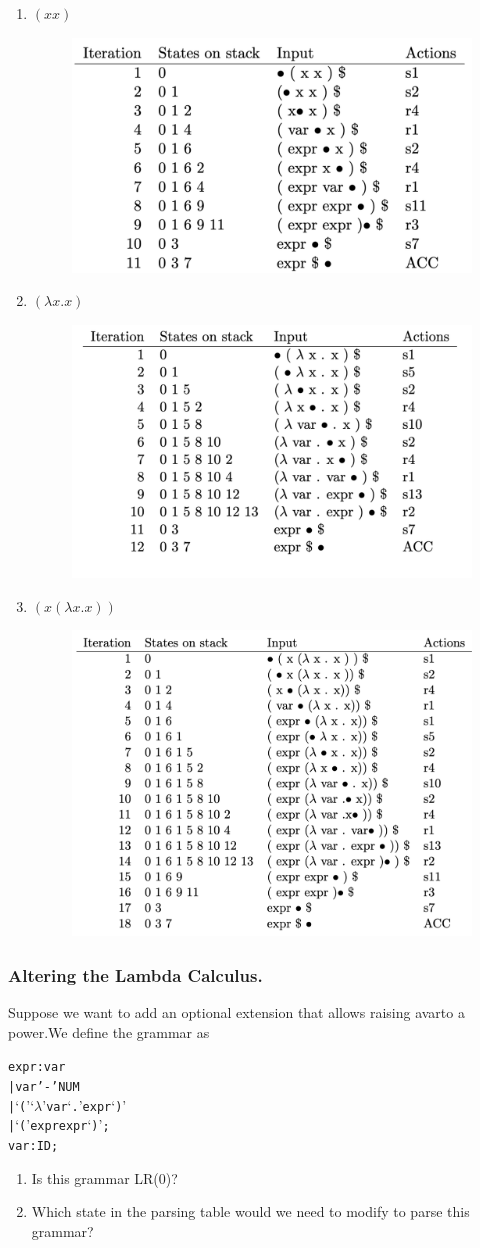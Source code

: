 \documentclass[a4paper]{exam}
\begin{document}
\begin{enumerate}
    \item $(x x)$
     \begin{figure}[htbp]
    \centering
    \includegraphics[width=0.5\columnwidth]{./img/lambda0.png}
  \end{figure}
    \item $(\lambda x . x)$
    \begin{figure}[htbp]
    \centering
    \includegraphics[width=0.5\columnwidth]{./img/lambda1.png}
  \end{figure}
  \item $(x(\lambda x . x))$
   \begin{figure}[htbp]
    \centering
    \includegraphics[width=0.5\columnwidth]{./img/lambda2.png}
  \end{figure}
\end{enumerate}


\subsubsection{Altering the Lambda Calculus.}
Suppose we want to add an optional extension that allows raising avarto a power.We define the grammar as
\begin{alltt}
  expr : var 
       | var '-' NUM
       | ‘(’ ‘\(\lambda\)’ var ‘.’ expr ‘)’
       | ‘(’ expr expr ‘)’ ;
  var  : ID ;
  \end{alltt}
  \begin{enumerate}
    \item Is this grammar LR(0)?
    \item Which state in the parsing table would we need to modify to parse this grammar?
  \end{enumerate}
\end{document}
